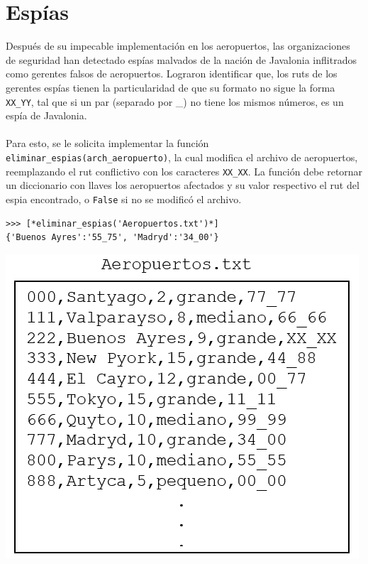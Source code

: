 \section{Espías}
Después de su impecable implementación en los aeropuertos, las organizaciones de seguridad han detectado espías malvados de la nación de Javalonia inflitrados como gerentes falsos de aeropuertos. Lograron identificar que, los ruts de los gerentes espías tienen la particularidad de que su formato no sigue la forma \texttt{XX\_YY}, tal que si un par (separado por \_) no tiene los mismos números, es un espía de Javalonia.\\\\
Para esto, se le solicita implementar la función \texttt{eliminar\_espias(arch\_aeropuerto)}, la cual modifica el archivo de aeropuertos, reemplazando el rut conflictivo con los caracteres \texttt{XX\_XX}. La función debe retornar un diccionario con llaves los aeropuertos afectados y su valor respectivo el rut del espia encontrado, o \texttt{False} si no se modificó el archivo. 
\begin{lstlisting}[style=consola]
>>> [*eliminar_espias('Aeropuertos.txt')*]
{'Buenos Ayres':'55_75', 'Madryd':'34_00'}
\end{lstlisting}
\begin{center}
\includegraphics[scale=0.6]{Imagenes/espias.PNG}
\end{center}
